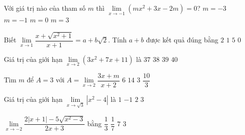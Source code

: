 \begin{ex}%
	Với giá trị nào của tham số $m$ thì  $\lim\limits_{x\to -1}\left( mx^2+3x-2m \right)=0$?
	 \choice
		 {\True $m=-3$}
		 {$m=-1$}
		{$m=0$} 
		{$m=3$} 
\end{ex}

\begin{ex}%
	Biết $\lim\limits_{x\to 1}\dfrac{x+\sqrt{x^2+1}}{x+1}=a+b\sqrt{2}$. Tính $a+b$  được kết quả đúng bằng
	\choice 
		{$2$} 
		 {\True $1$}
		{$5$} 
		{$0$} 
\end{ex}

\begin{ex}%
	Giá  trị của giới hạn $\lim\limits_{x\to 2}(3x^2+7x+11)$ là
	\choice 
		{\True  $37$}
		{$38$} 
		{$39$} 
		{$40$} 
\end{ex}

\begin{ex}%
	Tìm $m$ để  $A=3$ với $A=\lim\limits_{x\to 2}\dfrac{3x+m}{x+2}$
	 \choice
		{\True  $6$}
		{$14$} 
		{$3$} 
		 {$\dfrac{10}{3}$}
\end{ex}

\begin{ex}%
	 Giá trị của giới hạn $\lim\limits_{x\to \sqrt{3}}\left| x^2-4\right|$ là
	\choice 
		{\True $1$} 
		 {$-1$}
		{$2$} 
		 {$3$}
\end{ex}

\begin{ex}%
	$\lim\limits_{x\to-2}\dfrac{2|x+1|-5  \sqrt{x^2-3}}{2 x+3}$ bằng
	\choice 
		{$\dfrac{1}{3}$} 
		 {$\dfrac{1}{7}$}
		 {$7$}
		 {\True $3$}
\end{ex}

